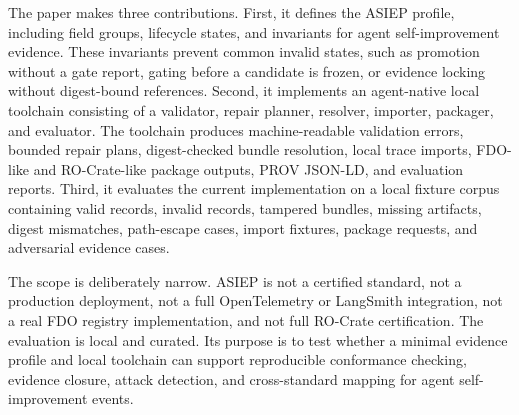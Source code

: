 The paper makes three contributions. First, it defines the ASIEP profile, including field groups, lifecycle states, and invariants for agent self-improvement evidence. These invariants prevent common invalid states, such as promotion without a gate report, gating before a candidate is frozen, or evidence locking without digest-bound references. Second, it implements an agent-native local toolchain consisting of a validator, repair planner, resolver, importer, packager, and evaluator. The toolchain produces machine-readable validation errors, bounded repair plans, digest-checked bundle resolution, local trace imports, FDO-like and RO-Crate-like package outputs, PROV JSON-LD, and evaluation reports. Third, it evaluates the current implementation on a local fixture corpus containing valid records, invalid records, tampered bundles, missing artifacts, digest mismatches, path-escape cases, import fixtures, package requests, and adversarial evidence cases.

The scope is deliberately narrow. ASIEP is not a certified standard, not a production deployment, not a full OpenTelemetry or LangSmith integration, not a real FDO registry implementation, and not full RO-Crate certification. The evaluation is local and curated. Its purpose is to test whether a minimal evidence profile and local toolchain can support reproducible conformance checking, evidence closure, attack detection, and cross-standard mapping for agent self-improvement events.
